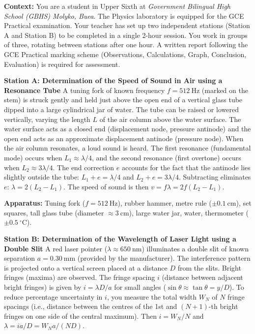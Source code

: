\documentclass[11pt]{article}
\newcommand{\cle}[1]{{\popxbold\color{popdark}#1}}
\newcounter{popsec}
\newcounter{popsub}
\newcommand{\courssub}[1]{%
  \stepcounter{popsub}%
  \par\vspace{9pt}\noindent{\popxbold\fontsize{11.5}{13}\selectfont\color{popink}{\color{poporange}\thepopsec.\thepopsub}\hspace{6pt}#1}\par\nopagebreak\vspace{4pt}
}
\begin{document}
\courssub{Situation}
\textbf{Context:} You are a student in Upper Sixth at \emph{Government Bilingual High School (GBHS) Molyko, Buea}. The Physics laboratory is equipped for the GCE Practical examination. Your teacher has set up two independent stations (Station A and Station B) to be completed in a single 2-hour session. You work in groups of three, rotating between stations after one hour. A written report following the GCE Practical marking scheme (Observations, Calculations, Graph, Conclusion, Evaluation) is required for assessment.

\textbf{Station A: Determination of the Speed of Sound in Air using a Resonance Tube}
A tuning fork of known frequency $f = \SI{512}{\hertz}$ (marked on the stem) is struck gently and held just above the open end of a vertical glass tube dipped into a large cylindrical jar of water. The tube can be raised or lowered vertically, varying the length $L$ of the air column above the water surface. The water surface acts as a \cle{closed end} (displacement node, pressure antinode) and the open end acts as an approximate \cle{displacement antinode} (pressure node). When the air column resonates, a loud sound is heard. The first resonance (fundamental mode) occurs when $L_1 \approx \lambda/4$, and the second resonance (first overtone) occurs when $L_2 \approx 3\lambda/4$. The \cle{end correction} $e$ accounts for the fact that the antinode lies slightly outside the tube: $L_1 + e = \lambda/4$ and $L_2 + e = 3\lambda/4$. Subtracting eliminates $e$: $\lambda = 2(L_2 - L_1)$. The speed of sound is then $v = f\lambda = 2f(L_2 - L_1)$.

\textbf{Apparatus:} Tuning fork ($f = \SI{512}{\hertz}$), rubber hammer, metre rule ($\pm \SI{0.1}{\centi\metre}$), set squares, tall glass tube (diameter $\approx \SI{3}{\centi\metre}$), large water jar, water, thermometer ($\pm \SI{0.5}{\ensuremath{{}^{\circ}\mathrm{C}}}$).

\textbf{Station B: Determination of the Wavelength of Laser Light using a Double Slit}
A red laser pointer ($\lambda \approx \SI{650}{\nano\metre}$) illuminates a double slit of known separation $a = \SI{0.30}{\milli\metre}$ (provided by the manufacturer). The interference pattern is projected onto a vertical screen placed at a distance $D$ from the slits. Bright fringes (maxima) are observed. The fringe spacing $i$ (distance between adjacent bright fringes) is given by $i = \lambda D / a$ for small angles ($\sin\theta \approx \tan\theta = y/D$). To reduce percentage uncertainty in $i$, you measure the total width $W_N$ of $N$ fringe spacings (i.e., distance between the centres of the 1st and $(N+1)$-th bright fringes on one side of the central maximum). Then $i = W_N / N$ and $\lambda = i a / D = W_N a / (N D)$.
\end{document}
